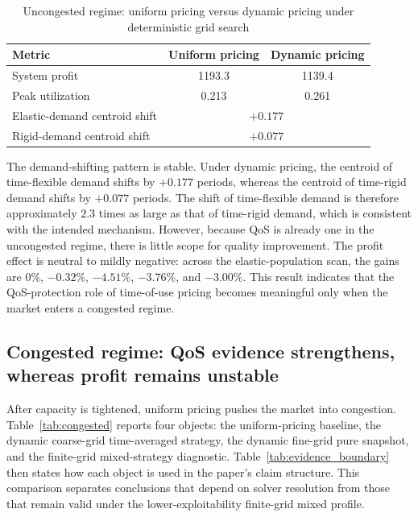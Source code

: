 \documentclass[11pt,a4paper]{article}
\begin{document}
\begin{table}[H]
\centering
\caption{Uncongested regime: uniform pricing versus dynamic pricing under deterministic grid search}
\label{tab:uncongested}
\begin{tabular}{lcc}
\toprule
Metric & Uniform pricing & Dynamic pricing \\
\midrule
System profit & 1193.3 & 1139.4 \\
Peak utilization & 0.213 & 0.261 \\
Elastic-demand centroid shift & \multicolumn{2}{c}{$+0.177$} \\
Rigid-demand centroid shift & \multicolumn{2}{c}{$+0.077$} \\
\bottomrule
\end{tabular}
\end{table}

The demand-shifting pattern is stable. Under dynamic pricing, the centroid of time-flexible demand shifts by $+0.177$ periods, whereas the centroid of time-rigid demand shifts by $+0.077$ periods. The shift of time-flexible demand is therefore approximately $2.3$ times as large as that of time-rigid demand, which is consistent with the intended mechanism. However, because QoS is already one in the uncongested regime, there is little scope for quality improvement. The profit effect is neutral to mildly negative: across the elastic-population scan, the gains are $0\%$, $-0.32\%$, $-4.51\%$, $-3.76\%$, and $-3.00\%$. This result indicates that the QoS-protection role of time-of-use pricing becomes meaningful only when the market enters a congested regime.

\subsection{Congested regime: QoS evidence strengthens, whereas profit remains unstable}

After capacity is tightened, uniform pricing pushes the market into congestion. Table~\ref{tab:congested} reports four objects: the uniform-pricing baseline, the dynamic coarse-grid time-averaged strategy, the dynamic fine-grid pure snapshot, and the finite-grid mixed-strategy diagnostic. Table~\ref{tab:evidence_boundary} then states how each object is used in the paper's claim structure. This comparison separates conclusions that depend on solver resolution from those that remain valid under the lower-exploitability finite-grid mixed profile.
\end{document}
